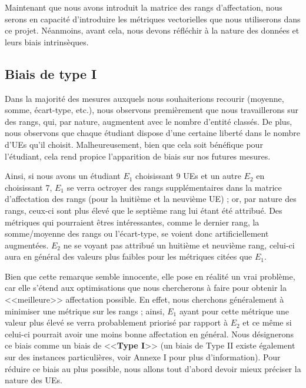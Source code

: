 \documentclass{rapport}
\theoremstyle{definition}
\theoremstyle{remark}
\theoremstyle{plain}
\theoremstyle{definition}
\theoremstyle{remark}
\begin{document}
Maintenant que nous avons introduit la matrice des rangs d'affectation, nous serons en capacité d'introduire les métriques vectorielles que nous utiliserons dans ce projet.
Néanmoins, avant cela, nous devons réfléchir à la nature des données et leurs biais intrinsèques.

\subsection{Biais de type I}
Dans la majorité des mesures auxquels nous souhaiterions recourir (moyenne, somme, écart-type, etc.), nous observons premièrement que nous travaillerons sur des rangs, qui, par nature, augmentent avec le nombre d'entité classés.
De plus, nous observons que chaque étudiant dispose d'une certaine liberté dans le nombre d'UEs qu'il choisit. Malheureusement, bien que cela soit bénéfique pour l'étudiant, cela rend propice l'apparition de biais sur nos futures mesures.

Ainsi, si nous avons un étudiant $E_1$ choisissant 9 UEs et un autre $E_2$ en choisissant 7, $E_1$ se verra octroyer des rangs supplémentaires dans la matrice d'affectation des rangs (pour la huitième et la neuvième UE) ; or, par nature des rangs, ceux-ci sont plus élevé que le septième rang lui étant été attribué.
Des métriques qui pourraient êtres intéressantes, comme le dernier rang, la somme/moyenne des rangs ou l'écart-type, se voient donc artificiellement augmentées. $E_2$ ne se voyant pas attribué un huitième et neuvième rang, celui-ci aura en général des valeurs plus faibles pour les métriques citées que $E_1$.

Bien que cette remarque semble innocente, elle pose en réalité un vrai problème, car elle s'étend aux optimisations que nous chercherons à faire pour obtenir la <<meilleure>> affectation possible.
En effet, nous cherchons généralement à minimiser une métrique sur les rangs ; ainsi, $E_1$ ayant pour cette métrique une valeur plus élevé se verra probablement priorisé par rapport à $E_2$ et ce même si celui-ci pourrait avoir une moins bonne affectation en général.
Nous désignerons ce biais comme un biais de <<\textbf{Type I}>> (un biais de Type II existe également sur des instances particulières, voir Annexe I pour plus d'information).
Pour réduire ce biais au plus possible, nous allons tout d'abord devoir mieux préciser la nature des UEs.
\end{document}
